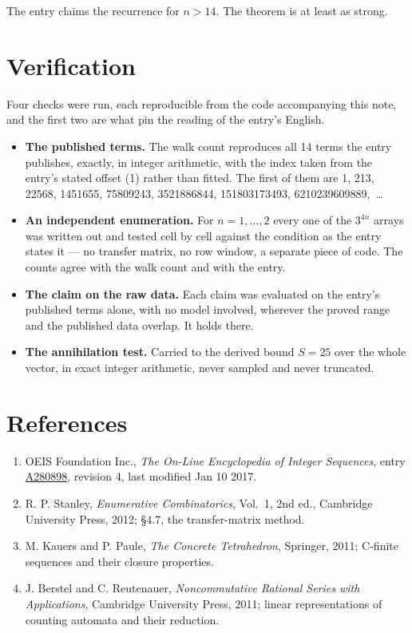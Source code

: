 \documentclass[11pt]{article}
\theoremstyle{definition}
\begin{document}
The entry claims the recurrence for $n > 14$. The theorem is at least as strong.

\section{Verification}

Four checks were run, each reproducible from the code accompanying this note, and the first two are what pin the reading of the entry's English.

\begin{itemize}

\item {\bfseries The published terms.} The walk count reproduces all 14 terms the entry publishes, exactly, in integer arithmetic, with the index taken from the entry's stated offset (1) rather than fitted. The first of them are 1, 213, 22568, 1451655, 75809243, 3521886844, 151803173493, 6210239609889,~\dots

\item {\bfseries An independent enumeration.} For $n = 1,\dots,2$ every one of the $3^{4n}$ arrays was written out and tested cell by cell against the condition as the entry states it --- no transfer matrix, no row window, a separate piece of code. The counts agree with the walk count and with the entry.

\item {\bfseries The claim on the raw data.} Each claim was evaluated on the entry's published terms alone, with no model involved, wherever the proved range and the published data overlap. It holds there.

\item {\bfseries The annihilation test.} Carried to the derived bound $S = 25$ over the whole vector, in exact integer arithmetic, never sampled and never truncated.

\end{itemize}

\section{References}

\begin{enumerate}

\item OEIS Foundation Inc., \emph{The On-Line Encyclopedia of Integer Sequences}, entry \href{https://oeis.org/A280898}{A280898}, revision 4, last modified Jan 10 2017.

\item R. P. Stanley, \emph{Enumerative Combinatorics}, Vol.~1, 2nd ed., Cambridge University Press, 2012; \S4.7, the transfer-matrix method.

\item M. Kauers and P. Paule, \emph{The Concrete Tetrahedron}, Springer, 2011; C-finite sequences and their closure properties.

\item J. Berstel and C. Reutenauer, \emph{Noncommutative Rational Series with Applications}, Cambridge University Press, 2011; linear representations of counting automata and their reduction.

\end{enumerate}
\end{document}
